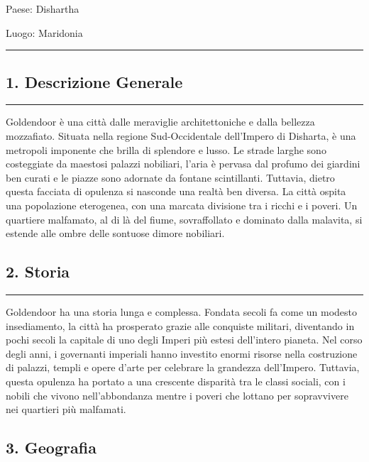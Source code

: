 Paese: Dishartha

Luogo: Maridonia

\begin{center}\rule{0.5\linewidth}{0.5pt}\end{center}

\subsection{1. Descrizione Generale}\label{descrizione-generale}

\begin{center}\rule{0.5\linewidth}{0.5pt}\end{center}

Goldendoor è una città dalle meraviglie architettoniche e dalla bellezza
mozzafiato. Situata nella regione Sud-Occidentale dell'Impero di
Disharta, è una metropoli imponente che brilla di splendore e lusso. Le
strade larghe sono costeggiate da maestosi palazzi nobiliari, l'aria è
pervasa dal profumo dei giardini ben curati e le piazze sono adornate da
fontane scintillanti. Tuttavia, dietro questa facciata di opulenza si
nasconde una realtà ben diversa. La città ospita una popolazione
eterogenea, con una marcata divisione tra i ricchi e i poveri. Un
quartiere malfamato, al di là del fiume, sovraffollato e dominato dalla
malavita, si estende alle ombre delle sontuose dimore nobiliari.

\subsection{2. Storia}\label{storia}

\begin{center}\rule{0.5\linewidth}{0.5pt}\end{center}

Goldendoor ha una storia lunga e complessa. Fondata secoli fa come un
modesto insediamento, la città ha prosperato grazie alle conquiste
militari, diventando in pochi secoli la capitale di uno degli Imperi più
estesi dell'intero pianeta. Nel corso degli anni, i governanti imperiali
hanno investito enormi risorse nella costruzione di palazzi, templi e
opere d'arte per celebrare la grandezza dell'Impero. Tuttavia, questa
opulenza ha portato a una crescente disparità tra le classi sociali, con
i nobili che vivono nell'abbondanza mentre i poveri che lottano per
sopravvivere nei quartieri più malfamati.

\subsection{3. Geografia}\label{geografia}

